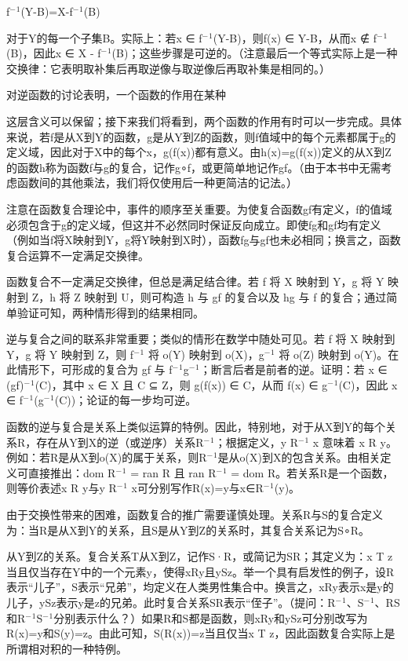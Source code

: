 \documentclass[12pt,a4paper]{ctexbook}
\theoremstyle{definition}
\theoremstyle{remark}
\begin{document}
{f$^{-}$$^{1}$(Y-B)=X-f$^{-}$$^{1}$(B)

对于Y的每一个子集B。实际上：若x ∈ f$^{-}$$^{1}$(Y-B)，则f(x) ∈ Y-B，从而x ∉ f$^{-}$$^{1}$(B)，因此x ∈ X - f$^{-}$$^{1}$(B)；这些步骤是可逆的。（注意最后一个等式实际上是一种交换律：它表明取补集后再取逆像与取逆像后再取补集是相同的。）

对逆函数的讨论表明，一个函数的作用在某种

这层含义可以保留；接下来我们将看到，两个函数的作用有时可以一步完成。具体来说，若f是从X到Y的函数，g是从Y到Z的函数，则f值域中的每个元素都属于g的定义域，因此对于X中的每个x，g(f(x))都有意义。由h(x)=g(f(x))定义的从X到Z的函数h称为函数f与g的复合，记作g∘f，或更简单地记作gf。（由于本书中无需考虑函数间的其他乘法，我们将仅使用后一种更简洁的记法。）

注意在函数复合理论中，事件的顺序至关重要。为使复合函数gf有定义，f的值域必须包含于g的定义域，但这并不必然同时保证反向成立。即使fg和gf均有定义（例如当f将X映射到Y，g将Y映射到X时），函数fg与gf也未必相同；换言之，函数复合运算不一定满足交换律。

函数复合不一定满足交换律，但总是满足结合律。若 f 将 X 映射到 Y，g 将 Y 映射到 Z，h 将 Z 映射到 U，则可构造 h 与 gf 的复合以及 hg 与 f 的复合；通过简单验证可知，两种情形得到的结果相同。

逆与复合之间的联系非常重要；类似的情形在数学中随处可见。若 f 将 X 映射到 Y，g 将 Y 映射到 Z，则 f$^{-}$$^{1}$ 将 o(Y) 映射到 o(X)，g$^{-}$$^{1}$ 将 o(Z) 映射到 o(Y)。在此情形下，可形成的复合为 gf 与 f$^{-}$$^{1}$g$^{-}$$^{1}$；断言后者是前者的逆。证明：若 x ∈ (gf)$^{-}$$^{1}$(C)，其中 x ∈ X 且 C ⊆ Z，则 g(f(x)) ∈ C，从而 f(x) ∈ g$^{-}$$^{1}$(C)，因此 x ∈ f$^{-}$$^{1}$(g$^{-}$$^{1}$(C))；论证的每一步均可逆。

函数的逆与复合是关系上类似运算的特例。因此，特别地，对于从X到Y的每个关系R，存在从Y到X的逆（或逆序）关系R$^{-}$$^{1}$；根据定义，y R$^{-}$$^{1}$ x 意味着 x R y。例如：若R是从X到o(X)的属于关系，则R$^{-}$$^{1}$是从o(X)到X的包含关系。由相关定义可直接推出：dom R$^{-}$$^{1}$ = ran R 且 ran R$^{-}$$^{1}$ = dom R。若关系R是一个函数，则等价表述x R y与y R$^{-}$$^{1}$ x可分别写作R(x)=y与x∈R$^{-}$$^{1}$({y})。

由于交换性带来的困难，函数复合的推广需要谨慎处理。关系R与S的复合定义为：当R是从X到Y的关系，且S是从Y到Z的关系时，其复合关系记为S∘R。

从Y到Z的关系。复合关系T从X到Z，记作S·R，或简记为SR；其定义为：x T z当且仅当存在Y中的一个元素y，使得xRy且ySz。举一个具有启发性的例子，设R表示“儿子”，S表示“兄弟”，均定义在人类男性集合中。换言之，xRy表示x是y的儿子，ySz表示y是z的兄弟。此时复合关系SR表示“侄子”。（提问：R$^{-}$$^{1}$、S$^{-}$$^{1}$、RS和R$^{-}$$^{1}$S$^{-}$$^{1}$分别表示什么？）如果R和S都是函数，则xRy和ySz可分别改写为R(x)=y和S(y)=z。由此可知，S(R(x))=z当且仅当x T z，因此函数复合实际上是所谓相对积的一种特例。

}
\end{document}
